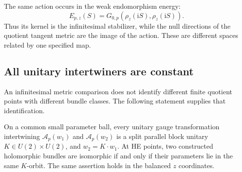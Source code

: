 The same action occurs in the weak endomorphism energy:
\begin{equation}\label{eq:shared-action-energy}
             E_{p,z}(S)=G_{0,p}(\rho_z(\mathrm iS),\rho_z(\mathrm iS)).
\end{equation}
Thus its kernel is the infinitesimal stabilizer, while
the null directions of the quotient tangent metric are
the image of the action. These are different spaces
related by one specified map.

\subsection{All unitary intertwiners are constant}

An infinitesimal metric comparison does not identify
different finite quotient points with different bundle
classes. The following statement supplies that identification.

\begin{theorem}\label{thm:unitary-rigidity}
On a common small parameter ball, every unitary gauge
transformation intertwining $\mathcal A_p(w_1)$ and
$\mathcal A_p(w_2)$ is a split parallel block unitary
$K\in U(2)\times U(2)$, and $w_2=K\cdot w_1$.
At HE points, two constructed holomorphic bundles are
isomorphic if and only if their parameters lie in the
same $K$-orbit. The same assertion holds in the balanced
$z$ coordinates.
\end{theorem}


